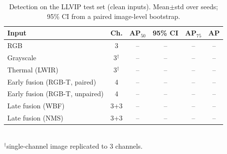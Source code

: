 \begin{table}[t]\centering\caption{Detection on the LLVIP test set (clean inputs). Mean$\pm$std over \NSeeds{} seeds; 95\% CI from a paired image-level bootstrap.}\label{tab:main}
\setlength{\tabcolsep}{3pt}\footnotesize
\begin{tabular}{@{}lccccc@{}}\toprule
Input & Ch. & AP$_{50}$ & 95\% CI & AP$_{75}$ & AP \\ \midrule
RGB & 3 & -- & -- & -- & -- \\
Grayscale & 3$^\dagger$ & -- & -- & -- & -- \\
Thermal (LWIR) & 3$^\dagger$ & -- & -- & -- & -- \\
Early fusion (RGB-T, paired) & 4 & -- & -- & -- & -- \\
Early fusion (RGB-T, unpaired) & 4 & -- & -- & -- & -- \\
Late fusion (WBF) & 3+3 & -- & -- & -- & -- \\
Late fusion (NMS) & 3+3 & -- & -- & -- & -- \\
\bottomrule\end{tabular}
\\[2pt]{\scriptsize $^\dagger$single-channel image replicated to 3 channels.}
\end{table}
